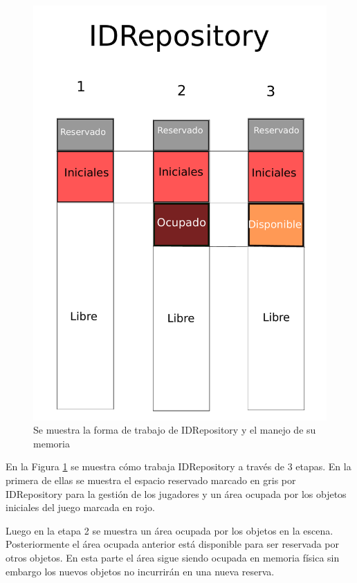 \documentclass[a4paper,12pt,openany,oneside]{book}
\begin{document}
\begin{figure}
\begin{center}
\includegraphics[scale=0.3]{repository.pdf} 
\end{center}
\caption[Forma de trabajo IDRepository]{Se muestra la forma de trabajo de IDRepository y el manejo de su memoria}
\label{repositorylabel}
\end{figure}
En la Figura \ref{repositorylabel} se muestra cómo trabaja IDRepository a través de 3 etapas. En la primera de ellas se muestra el espacio reservado marcado en gris por IDRepository para la gestión de los jugadores y un área ocupada por los objetos iniciales del juego marcada en rojo.

Luego en la etapa 2 se muestra un área ocupada por los objetos en la escena. Posteriormente el área ocupada anterior está disponible para ser reservada por otros objetos. En esta parte el área sigue siendo ocupada en memoria física sin embargo los nuevos objetos no incurrirán en una nueva reserva.
\end{document}
